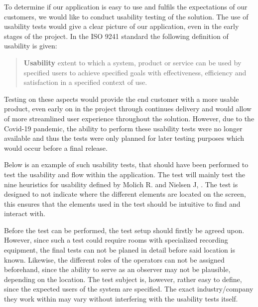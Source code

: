 To determine if our application is easy to use and fulfils the expectations of our customers, we would like to conduct usability testing of the solution. 
The use of usability tests would give a clear picture of our application, even in the early stages of the project.
In the ISO 9241 standard the following definition of usability is given:
\begin{quote}
    \textbf{Usability} extent to which a system, product or service can be used by specified users to achieve specified goals with effectiveness, efficiency and satisfaction in a specified context of use. \cite{ISO9241}
\end{quote}
Testing on these aspects would provide the end customer with a more usable product, even early on in the project through continues delivery and would allow of more streamlined user experience throughout the solution.
However, due to the Covid-19 pandemic, the ability to perform these usability tests were no longer available and thus the tests were only planned for later testing purposes which would occur before a final release.

Below is an example of such usability tests, that should have been performed to test the usability and flow within the application.
The test will mainly test the nine heuristics for usability defined by Molich R. and Nielsen J, \cite{Usability}.
The test is designed to not indicate where the different elements are located on the screen, this ensures that the elements used in the test should be intuitive to find and interact with.

Before the test can be performed, the test setup should firstly be agreed upon.
However, since such a test could require rooms with specialized recording equipment, the final tests can not be planed in detail before said location is known.
Likewise, the different roles of the operators can not be assigned beforehand, since the ability to serve as an observer may not be plausible, depending on the location.
The test subject is, however, rather easy to define, since the expected users of the system are specified.
The exact industry/company they work within may vary without interfering with the usability tests itself.

